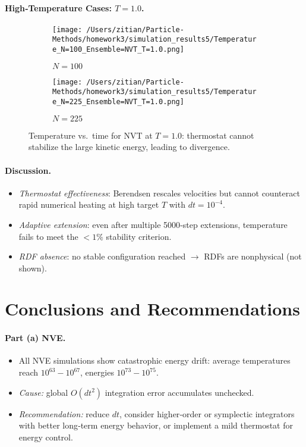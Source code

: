 \documentclass[11pt]{article}
\begin{document}
\paragraph{High‐Temperature Cases: $T=1.0$.}  
\begin{figure}[H]
  \centering
  \begin{subfigure}{0.45\textwidth}
    \texttt{[image: /Users/zitian/Particle-Methods/homework3/simulation\_results5/Temperature\_N=100\_Ensemble=NVT\_T=1.0.png]}
    \caption{$N=100$}
  \end{subfigure}%
  \begin{subfigure}{0.45\textwidth}
    \texttt{[image: /Users/zitian/Particle-Methods/homework3/simulation\_results5/Temperature\_N=225\_Ensemble=NVT\_T=1.0.png]}
    \caption{$N=225$}
  \end{subfigure}
  \caption{Temperature vs.\ time for NVT at $T=1.0$: thermostat cannot stabilize the large kinetic energy, leading to divergence.}
\end{figure}

\paragraph{Discussion.}
\begin{itemize}
  \item \emph{Thermostat effectiveness}: Berendsen rescales velocities but cannot counteract rapid numerical heating at high target $T$ with $dt=10^{-4}$.
  \item \emph{Adaptive extension}: even after multiple 5000‐step extensions, temperature fails to meet the $<1\%$ stability criterion.
  \item \emph{RDF absence}: no stable configuration reached $\to$ RDFs are nonphysical (not shown).
\end{itemize}

\section{Conclusions and Recommendations}
\paragraph{Part (a) NVE.}
\begin{itemize}
  \item All NVE simulations show catastrophic energy drift: average temperatures reach $10^{63}\!-\!10^{67}$, energies $10^{73}\!-\!10^{75}$.  
  \item \emph{Cause:} global $O(dt^2)$ integration error accumulates unchecked.  
  \item \emph{Recommendation:} reduce $dt$, consider higher‐order or symplectic integrators with better long‐term energy behavior, or implement a mild thermostat for energy control.
\end{itemize}
\end{document}
